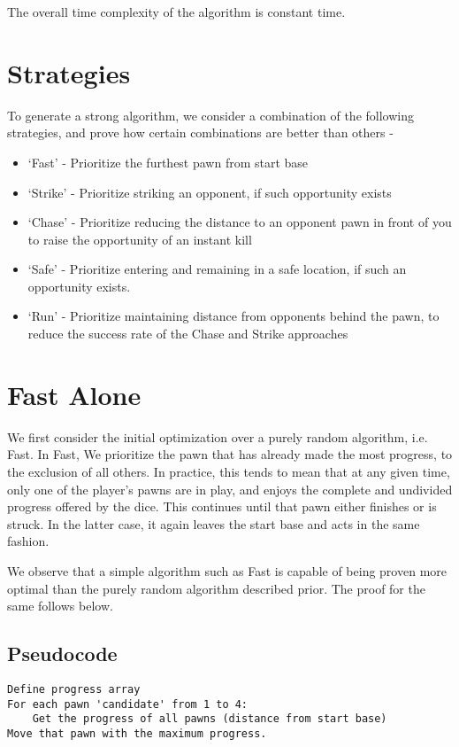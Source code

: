 \documentclass{article} %
\begin{document}
The overall time complexity of the algorithm is constant time.


\section{Strategies}
To generate a strong algorithm, we consider a combination of the following strategies, and prove how certain combinations are better than others -

\begin{itemize}
\item ‘Fast’ - Prioritize the furthest pawn from start base
\item ‘Strike’ - Prioritize striking an opponent, if such opportunity exists
\item ‘Chase’ - Prioritize reducing the distance to an opponent pawn in front of you to raise the opportunity of an instant kill
\item ‘Safe’ - Prioritize entering and remaining in a safe location, if such an opportunity exists.
\item ‘Run’ - Prioritize maintaining distance from opponents behind the pawn, to reduce the success rate of the Chase and Strike approaches
\end{itemize}

\section{Fast Alone}
We first consider the initial optimization over a purely random algorithm, i.e. Fast. In Fast, We prioritize the pawn that has already made the most progress, to the exclusion of all others. In practice, this tends to mean that at any given time, only one of the player’s pawns are in play, and enjoys the complete and undivided progress offered by the dice. This continues until that pawn either finishes or is struck. In the latter case, it again leaves the start base and acts in the same fashion.

We observe that a simple algorithm such as Fast is capable of being proven more optimal than the purely random algorithm described prior. The proof for the same follows below.

\subsection{Pseudocode} 
\begin{verbatim}
Define progress array
For each pawn 'candidate' from 1 to 4:
    Get the progress of all pawns (distance from start base)
Move that pawn with the maximum progress.
\end{verbatim}
\end{document}
